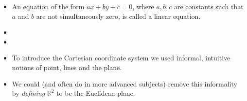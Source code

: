 \begin{frame}
\begin{definition}
\begin{itemize}
\item An equation of the form $ax+by+c=0$, where $a,b,c$ are constants such that $a$ and $b$ are not simultaneously zero, is called a linear equation.
\item<2->
\item<3->  
\end{itemize}
\end{definition}

\begin{itemize}
\item<4-> To introduce the Cartesian coordinate system we used informal, intuitive notions of point, lines and the plane.
\item<5-> We could (and often do in more advanced subjects) remove this informality by \emph{defining} $\mathbb R^2$ to be the Euclidean plane.
\end{itemize}
\end{frame}
